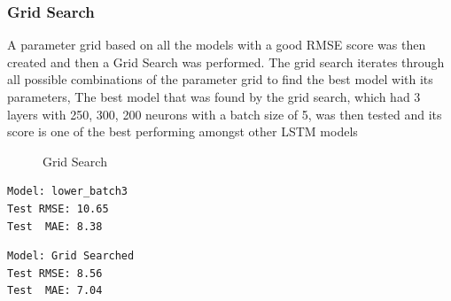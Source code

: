 \documentclass[10pt,11pt,12pt,oneside]{book}
\begin{document}
\subsubsection{Grid Search}
A parameter grid based on all the models with a good RMSE score was then created and then a Grid Search was performed. The grid search iterates through all possible combinations of the parameter grid to find the best model with its parameters, The best model that was found by the grid search, which had 3 layers with 250, 300, 200 neurons with a batch size of 5, was then tested and its score is one of the best performing amongst other LSTM models\\
\begin{figure}[H]
    \centering
    \qquad
    \caption{Grid Search}%
    \label{fig:grid}%
\end{figure}
\begin{multicols}{2}
\centering
\begin{verbatim}
Model: lower_batch3
Test RMSE: 10.65
Test  MAE: 8.38
\end{verbatim}
\begin{verbatim}
Model: Grid Searched
Test RMSE: 8.56
Test  MAE: 7.04
\end{verbatim}
\end{multicols}
\end{document}
